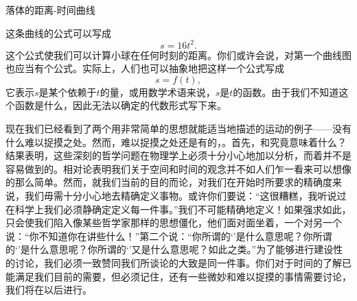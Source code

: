 \documentclass[12pt,oneside]{book}
\begin{document}
\begin{common-format}
\vspace{30pt}
\noindent
\begin{minipage}{\textwidth}
\begin{minipage}[c][6cm][c]{0.3\textwidth}
\begin{table}[H]
\centering
\medskip 
{}
\caption*{表 8-2}
\end{table}

\end{minipage}\hfill
\begin{minipage}[c][6cm][c]{0.7\textwidth}
\begin{linefig}[0.9]{落体的距离-时间曲线}
\caption{落体的距离-时间曲线}
\label{fig:落体的距离-时间曲线}
\end{linefig}
\end{minipage} 
\end{minipage} 

\vspace{42pt}
这条曲线的公式可以写成
\begin{equation}
\label{Eq:I:8:1}
s=16t^2.
\end{equation}
这个公式使我们可以计算小球在任何时刻的距离。你们或许会说，对第一个曲线图也应当有个公式。实际上，人们也可以抽象地把这样一个公式写成
\begin{equation}
\label{Eq:I:8:2}
s=f(t),
\end{equation}
它表示$s$是某个依赖于$t$的量，或用数学术语来说，$s$是$t$的函数。由于我们不知道这个函数是什么，因此无法以确定的代数形式写下来。

现在我们已经看到了两个用非常简单的思想就能适当地描述的运动的例子——没有什么难以捉摸之处。然而，难以捉摸之处还是有的，。首先，和究竟意味着什么？结果表明，这些深刻的哲学问题在物理学上必须十分小心地加以分析，而着并不是容易做到的。相对论表明我们关于空间和时间的观念并不如人们乍一看来可以想像的那么简单。然而，就我们当前的目的而论，对我们在开始时所要求的精确度来说，我们毋需十分小心地去精确定义事物。或许你们要说：“这很糟糕，我听说过在科学上我们必须静确定定义每一件事。”我们不可能精确地定义！如果强求如此，只会使我们陷入像某些哲学家那样的思想僵化，他们面对面坐着，一个对另一个说：“你不知道你在讲些什么！”第二个说：“你所谓的‘’是什么意思呢？你所谓的‘’是什么意思呢？你所谓的‘’又是什么意思呢？如此之类。”为了能够进行建设性的讨论，我们必须一致赞同我们所谈论的大致是同一件事。你们对于时间的了解已能满足我们目前的需要，但必须记住，还有一些微妙和难以捉摸的事情需要讨论，我们将在以后进行。


\end{common-format}
\end{document}
